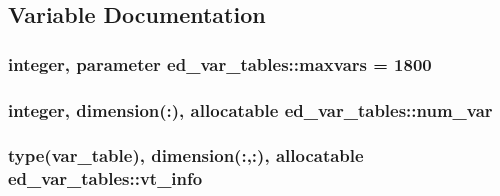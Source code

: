 \subsection{Variable Documentation}
\subsubsection[{\texorpdfstring{maxvars}{maxvars}}]{\setlength{\rightskip}{0pt plus 5cm}integer, parameter ed\+\_\+var\+\_\+tables\+::maxvars = 1800}\hypertarget{namespaceed__var__tables_a932cd6738531dd3348d40636bd8a20ae}{}\label{namespaceed__var__tables_a932cd6738531dd3348d40636bd8a20ae}
\subsubsection[{\texorpdfstring{num\+\_\+var}{num_var}}]{\setlength{\rightskip}{0pt plus 5cm}integer, dimension(\+:), allocatable ed\+\_\+var\+\_\+tables\+::num\+\_\+var}\hypertarget{namespaceed__var__tables_ae879757190201e461d3bc09131321a64}{}\label{namespaceed__var__tables_ae879757190201e461d3bc09131321a64}
\subsubsection[{\texorpdfstring{vt\+\_\+info}{vt_info}}]{\setlength{\rightskip}{0pt plus 5cm}type({\bf var\+\_\+table}), dimension(\+:,\+:), allocatable ed\+\_\+var\+\_\+tables\+::vt\+\_\+info}\hypertarget{namespaceed__var__tables_a949fa9110a835bd59e16bd0a5e153498}{}\label{namespaceed__var__tables_a949fa9110a835bd59e16bd0a5e153498}
